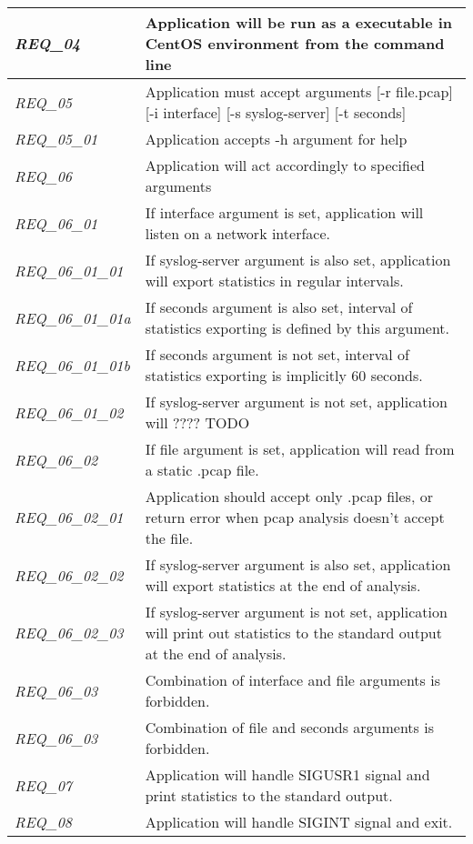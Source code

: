 \begin{table}[H]
{\begin{tabular}{@{}|l|l|@{}}
\textit{REQ\_04} & Application will be run as a executable in CentOS environment from the command line \\ \midrule
\textit{REQ\_05} & Application must accept arguments {[}-r file.pcap{]} {[}-i interface{]} {[}-s syslog-server{]} {[}-t seconds{]} \\ \midrule
\textit{REQ\_05\_01} & Application accepts -h argument for help \\ \midrule
\textit{REQ\_06} & Application will act accordingly to specified arguments \\ \midrule
\textit{REQ\_06\_01} & If interface argument is set, application will listen on a network interface. \\ \midrule
\textit{REQ\_06\_01\_01} & If syslog-server argument is also set, application will export statistics in regular intervals. \\ \midrule
\textit{REQ\_06\_01\_01a} & If seconds argument is also set, interval of statistics exporting is defined by this argument. \\ \midrule
\textit{REQ\_06\_01\_01b} & If seconds argument is not set, interval of statistics exporting is implicitly 60 seconds. \\ \midrule
\textit{REQ\_06\_01\_02} & If syslog-server argument is not set, application will ???? TODO \\ \midrule
\textit{REQ\_06\_02} & If file argument is set, application will read from a static .pcap file. \\ \midrule
\textit{REQ\_06\_02\_01} & Application should accept only .pcap files, or return error when pcap analysis doesn't accept the file. \\ \midrule
\textit{REQ\_06\_02\_02} & If syslog-server argument is also set, application will export statistics at the end of analysis. \\ \midrule
\textit{REQ\_06\_02\_03} & If syslog-server argument is not set, application will print out statistics to the standard output at the end of analysis. \\ \midrule
\textit{REQ\_06\_03} & Combination of interface and file arguments is forbidden. \\ \midrule
\textit{REQ\_06\_03} & Combination of file and seconds arguments is forbidden. \\ \midrule
\textit{REQ\_07} & Application will handle SIGUSR1 signal and print statistics to the standard output. \\ \midrule
\textit{REQ\_08} & Application will handle SIGINT signal and exit. \\ \midrule

\end{tabular}}
\end{table}
